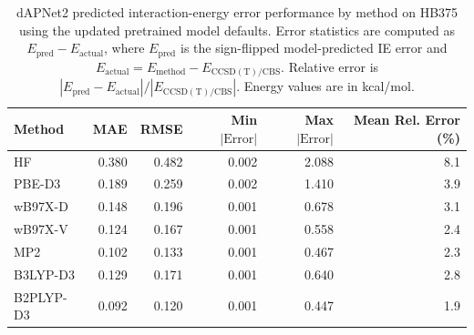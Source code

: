 \begin{table}
    \centering
    \caption{dAPNet2 predicted interaction-energy error performance by method on HB375 using the updated pretrained model defaults. Error statistics are computed as $E_{\mathrm{pred}} - E_{\mathrm{actual}}$, where $E_{\mathrm{pred}}$ is the sign-flipped model-predicted IE error and $E_{\mathrm{actual}} = E_{\mathrm{method}} - E_{\mathrm{CCSD(T)/CBS}}$. Relative error is $|E_{\mathrm{pred}} - E_{\mathrm{actual}}|/|E_{\mathrm{CCSD(T)/CBS}}|$. Energy values are in kcal/mol.}
    \label{tab:hb375_dapnet2_method_errors}
    \begin{tabular*}{\textwidth}{@{\extracolsep{\fill}} lrrrrr}
        \hline
        Method & MAE & RMSE & Min $|\mathrm{Error}|$ & Max $|\mathrm{Error}|$ & Mean Rel. Error (\%) \\
        \hline
        HF & 0.380 & 0.482 & 0.002 & 2.088 & 8.1 \\
        PBE-D3 & 0.189 & 0.259 & 0.002 & 1.410 & 3.9 \\
        wB97X-D & 0.148 & 0.196 & 0.001 & 0.678 & 3.1 \\
        wB97X-V & 0.124 & 0.167 & 0.001 & 0.558 & 2.4 \\
        MP2 & 0.102 & 0.133 & 0.001 & 0.467 & 2.3 \\
        B3LYP-D3 & 0.129 & 0.171 & 0.001 & 0.640 & 2.8 \\
        B2PLYP-D3 & 0.092 & 0.120 & 0.001 & 0.447 & 1.9 \\
        \hline
    \end{tabular*}
\end{table}
